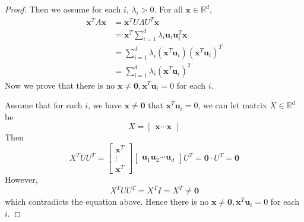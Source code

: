 \documentclass[12pt]{article}
\newcommand{\R}{\mathbb{R}}
\renewcommand{\vec}[1]{\mathbf{#1}}
\begin{document}
\begin{enumerate}[1)]
\begin{enumerate}[(a)]
\begin{proof}
            Then we assume for each $i$, $\lambda_{i} > 0$. For all $\vec{x} \in \R^{d}$,
            \begin{align*}
           \vec{x}^{T}A\vec{x} & = \vec{x}^{T}U\Lambda U^{T} \vec{x}\\
           & = \vec{x}^{T}\sum_{i=1}^{d}\lambda_{i}\vec{u}_{i}\vec{u}_{i}^{T}\vec{x} \\
           &=  \sum_{i=1}^{d}\lambda_{i}(\vec{x}^{T}\vec{u}_{i})(\vec{x}^{T}\vec{u}_{i})^{T} \\
           & = \sum_{i=1}^{d}\lambda_{i}(\vec{x}^{T}\vec{u}_{i})^{2}
           \end{align*}
           Now we prove that there is no $\vec{x} \neq \vec{0}, \vec{x}^{T}\vec{u}_{i}  = 0$ for each $i$.
           
           Assume that for each $i$, we have $\vec{x} \neq \vec{0}$ that $\vec{x}^{T}\vec{u}_{i} = 0$, we can let matrix $X \in \R^{d}$ be
           $$X = \left[
           	\begin{matrix}
            		\vec{x}   \cdots  \vec{x}
            \end{matrix}
           \right]$$
           Then 
           $$ X^{T}UU^{T} = \left[
           \begin{matrix}
           		\vec{x}^{T} \\
                \vdots \\
                \vec{x}^{T}
           \end{matrix}
           \right]
           \left[
           \begin{matrix}
           		\vec{u}_{1}  \vec{u}_{2} \cdots \vec{u}_{d}
           \end{matrix}
           \right] U^{T} = \vec{0} \cdot U^{T} = \vec{0}$$
			However,
            $$  X^{T}UU^{T} = X^{T}I = X^{T} \neq \vec{0} $$
            which contradicts the equation above. Hence there is no $\vec{x} \neq \vec{0}, \vec{x}^{T}\vec{u}_{i}  = 0$ for each $i$.
            

\end{proof}
\end{enumerate}
\end{enumerate}
\end{document}
